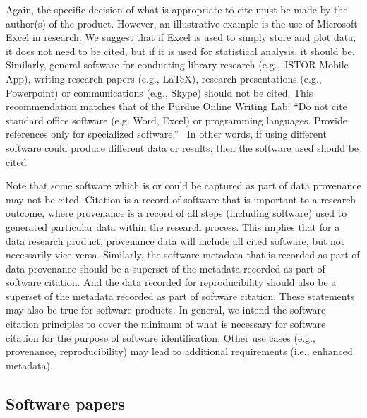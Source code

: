 \documentclass[11pt, oneside]{amsart}
\newcommand{\dmnote}[1]{ {\textcolor{purple} { ***DM: #1 }}} %
\newcommand{\ssnote}[1]{ {\textcolor{bondiblue} { ***SS: #1}}} %
\begin{document}
Again, the specific decision of what is appropriate to cite must be made by the author(s) of the product.
However, an illustrative example is the use of Microsoft Excel in research.
We suggest that if Excel is used to simply store and plot data, it does not need to be cited, but if it is used for statistical analysis, it should be.  Similarly, general software for conducting library research (e.g., JSTOR Mobile App), writing research papers (e.g., \LaTeX), research presentations (e.g., Powerpoint) or communications (e.g., Skype) should not be cited.
This recommendation matches that of the Purdue Online Writing Lab: ``Do not cite standard office software (e.g. Word, Excel) or programming languages.  Provide references only for specialized software.''~\cite{powl-citing-software}  In other words, if using different software could produce different data or results, then the software used should be cited.

Note that some software which is or could be captured as part of data provenance may not be cited.
Citation is a record of software that is important to a research outcome, where provenance is a record of all steps (including software) used to generated particular data within the research process.
This implies that for a data research product, provenance data will include all cited software, but not necessarily vice versa.
Similarly, the software metadata that is recorded as part of data provenance should be a superset of the metadata recorded as part of software citation.
And the data recorded for reproducibility should also be a superset of the metadata recorded as part of software citation.
These statements may also be true for software products.
In general, we intend the software citation principles to cover the minimum of what is necessary for software citation for the purpose of software identification.
Other use cases (e.g., provenance, reproducibility) may lead to additional requirements (i.e., enhanced metadata).

\subsection{Software papers} \label{sec:software_papers}
\end{document}

